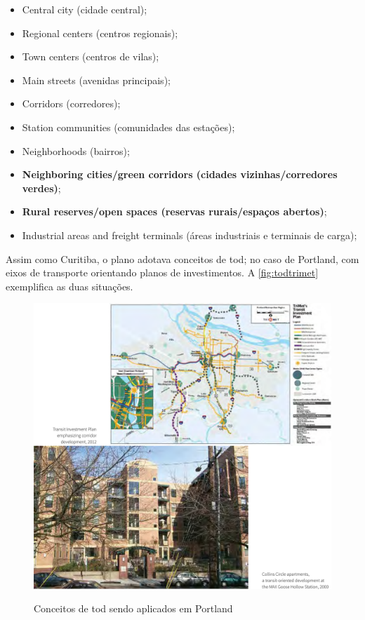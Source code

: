 	\begin{itemize}
		\item Central city (cidade central);
		\item Regional centers (centros regionais);
		\item Town centers (centros de vilas);
		\item Main streets (avenidas principais);
		\item Corridors (corredores);
		\item Station communities (comunidades das estações);
		\item Neighborhoods (bairros);
		\item \textbf{Neighboring cities/green corridors (cidades vizinhas/corredores verdes)};
		\item \textbf{Rural reserves/open spaces (reservas rurais/espaços abertos)};
		\item Industrial areas and freight terminals (áreas industriais e terminais de carga);
	\end{itemize}
	
	Assim como Curitiba, o plano adotava conceitos de \gls{tod}; no caso de Portland, com eixos de transporte orientando planos de investimentos. A \autoref{fig:todtrimet} exemplifica as duas situações.
	
	\begin{figure}
		\centering
		\caption{Conceitos de \gls{tod} sendo aplicados em Portland}
		\includegraphics[width=0.9\linewidth]{img/trimet2015a_01}
		\label{fig:todtrimet}
	\end{figure}

